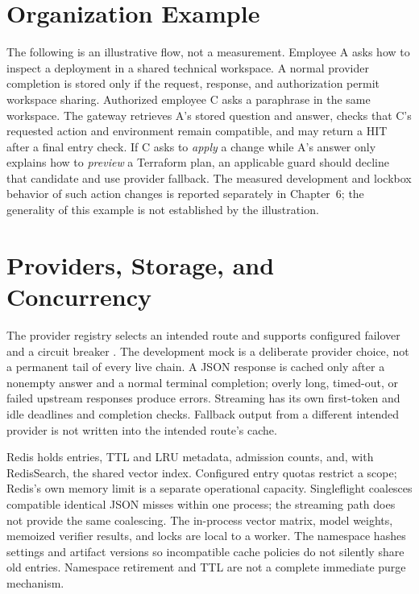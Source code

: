 \section{Organization Example}
The following is an illustrative flow, not a measurement. Employee A asks how to inspect a deployment in a shared technical workspace. A normal provider completion is stored only if the request, response, and authorization permit workspace sharing. Authorized employee C asks a paraphrase in the same workspace. The gateway retrieves A's stored question and answer, checks that C's requested action and environment remain compatible, and may return a HIT after a final entry check. If C asks to \emph{apply} a change while A's answer only explains how to \emph{preview} a Terraform plan, an applicable guard should decline that candidate and use provider fallback. The measured development and lockbox behavior of such action changes is reported separately in Chapter~6; the generality of this example is not established by the illustration.

\section{Providers, Storage, and Concurrency}
The provider registry selects an intended route and supports configured failover and a circuit breaker \cite{nygard2018release}. The development mock is a deliberate provider choice, not a permanent tail of every live chain. A JSON response is cached only after a nonempty answer and a normal terminal completion; overly long, timed-out, or failed upstream responses produce errors. Streaming has its own first-token and idle deadlines and completion checks. Fallback output from a different intended provider is not written into the intended route's cache.

Redis holds entries, TTL and LRU metadata, admission counts, and, with RedisSearch, the shared vector index. Configured entry quotas restrict a scope; Redis's own memory limit is a separate operational capacity. Singleflight coalesces compatible identical JSON misses within one process; the streaming path does not provide the same coalescing. The in-process vector matrix, model weights, memoized verifier results, and locks are local to a worker. The namespace hashes settings and artifact versions so incompatible cache policies do not silently share old entries. Namespace retirement and TTL are not a complete immediate purge mechanism.

